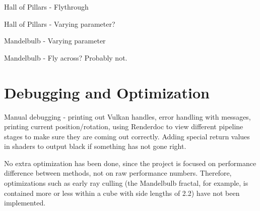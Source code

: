 Hall of Pillars - Flythrough

Hall of Pillars - Varying parameter?

Mandelbulb - Varying parameter

Mandelbulb - Fly across? Probably not.

\section{Debugging and Optimization}

Manual debugging - printing out Vulkan handles, error handling with messages, printing current position/rotation, using Renderdoc to view different pipeline stages to make sure they are coming out correctly. Adding special return values in shaders to output black if something has not gone right.

No extra optimization has been done, since the project is focused on performance difference between methods, not on raw performance numbers. Therefore, optimizations such as early ray culling (the Mandelbulb fractal, for example, is contained more or less within a cube with side lengths of 2.2) have not been implemented.